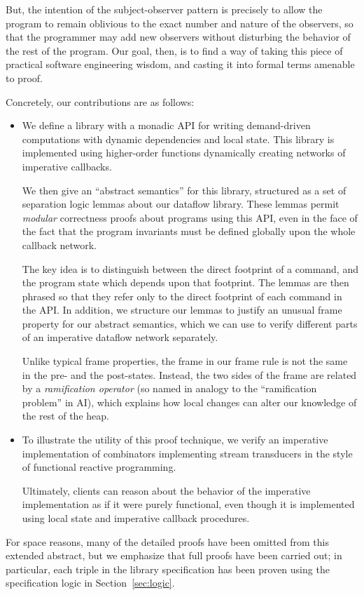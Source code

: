 \documentclass[natbib]{sigplanconf}
\begin{document}
But, the intention of the subject-observer pattern is
precisely to allow the program to remain oblivious to the exact number
and nature of the observers, so that the programmer may add new
observers without disturbing the behavior of the rest of the program.
Our goal, then, is to find a way of taking this piece of practical
software engineering wisdom, and casting it into formal terms amenable
to proof.

Concretely, our contributions are as follows: 

\begin{itemize}
  \item We define a library with a monadic API for writing
    demand-driven computations with dynamic dependencies and local
    state. This library is implemented using higher-order functions
    dynamically creating networks of imperative callbacks.

    We then give an ``abstract semantics'' for this
    library, structured as a set of separation logic lemmas about our
    dataflow library. These lemmas permit \emph{modular} correctness
    proofs about programs using this API, even in the face of the fact
    that the program invariants must be defined globally upon the
    whole callback network.

    The key idea is to distinguish between the direct footprint of a
    command, and the program state which depends upon that
    footprint. The lemmas are then phrased so that they refer only to
    the direct footprint of each command in the API. In addition, we
    structure our lemmas to justify an unusual frame property for our
    abstract semantics, which we can use to verify different parts of
    an imperative dataflow network separately.

    Unlike typical frame properties, the frame in our frame rule is
    not the same in the pre- and the post-states. Instead, the two
    sides of the frame are related by a \emph{ramification operator}
    (so named in analogy to the ``ramification problem'' in AI), which
    explains how local changes can alter our knowledge of the rest of
    the heap.

  \item To illustrate the utility of this proof technique, we verify
    an imperative implementation of combinators implementing stream
    transducers in the style of functional reactive programming. 

    Ultimately, clients can reason about the behavior of the imperative
    implementation as if it were purely functional, even though it
    is implemented using local state and imperative callback
    procedures.
\end{itemize}
%
For space reasons, many of the detailed proofs have been omitted from
this extended abstract, but we emphasize that full proofs have been
carried out; in particular, each triple in the library specification
has been proven using the specification logic in
Section~\ref{sec:logic}.
\end{document}
